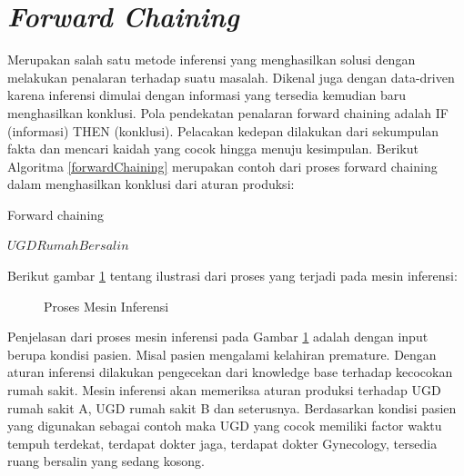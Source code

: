 \section{\textit{Forward Chaining}}
Merupakan salah satu metode inferensi yang menghasilkan solusi dengan melakukan penalaran terhadap suatu masalah. Dikenal juga dengan data-driven karena inferensi dimulai dengan informasi yang tersedia kemudian baru menghasilkan konklusi. Pola pendekatan penalaran forward chaining adalah IF (informasi) THEN (konklusi). Pelacakan kedepan dilakukan dari sekumpulan fakta dan mencari kaidah yang cocok hingga menuju kesimpulan. Berikut Algoritma \ref{forwardChaining} merupakan contoh dari proses forward chaining dalam menghasilkan konklusi dari aturan produksi: 
\begin{algorithm}
	\caption{Forward chaining}
	\label{forwardChaining}
	\begin{algorithmic}[1]
		\State $UGD Rumah$$ Bersalin$
		\EndIf
	\end{algorithmic}
\end{algorithm}

Berikut gambar \ref{fig:inferensi} tentang ilustrasi dari proses yang terjadi pada mesin inferensi:

\begin{figure}[h]	
	{\par}
	\caption{Proses Mesin Inferensi}
	\label{fig:inferensi}
\end{figure}

Penjelasan dari proses mesin inferensi pada Gambar \ref{fig:inferensi} adalah dengan input berupa kondisi pasien. Misal pasien mengalami kelahiran premature. Dengan aturan inferensi dilakukan pengecekan dari knowledge base terhadap kecocokan rumah sakit. Mesin inferensi akan memeriksa aturan produksi terhadap UGD rumah sakit A, UGD rumah sakit B dan seterusnya. Berdasarkan kondisi pasien yang digunakan sebagai contoh maka UGD yang cocok memiliki factor waktu tempuh terdekat, terdapat dokter jaga, terdapat dokter Gynecology, tersedia ruang bersalin yang sedang kosong.

